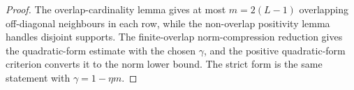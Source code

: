 \begin{proof}
    \leanok
    The overlap-cardinality lemma gives at most $m=2(L-1)$ overlapping
    off-diagonal neighbours in each row, while the non-overlap positivity lemma
    handles disjoint supports. The finite-overlap norm-compression reduction gives
    the quadratic-form estimate with the chosen $\gamma$, and the positive
    quadratic-form criterion converts it to the norm lower bound. The strict form
    is the same statement with $\gamma=1-\eta m$.
\end{proof}
